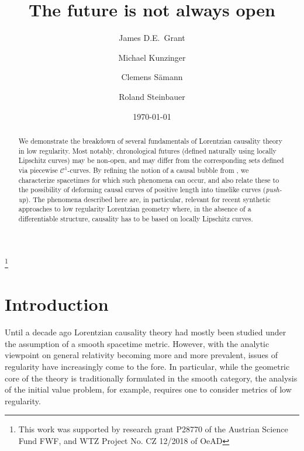 \documentclass[reqno]{amsart}
\numberwithin{equation}{section}
\theoremstyle{plain}
\theoremstyle{definition}
\theoremstyle{remark}
\begin{document}
\title{The future is not always open}
\author{James D.E.\ Grant}
\address{Department of Mathematics\\ University of Surrey\\ UK.}
\author{Michael Kunzinger}
\address{Faculty of Mathematics\\ University of Vienna\\ Austria.}
\author{Clemens S\"amann}
\address{Faculty of Mathematics\\ University of Vienna\\ Austria.}
\author{Roland Steinbauer}
\address{Faculty of Mathematics\\ University of Vienna\\ Austria.}
\date{\today}

\begin{abstract}
We demonstrate the breakdown of several fundamentals of Lorentzian causality theory in low regularity. 
Most notably, chronological futures (defined naturally using locally Lipschitz curves) may be non-open, and may differ from the corresponding
sets defined via piecewise $\mathcal{C}^1$-curves. By refining the notion of a causal bubble from \cite{CG:12},
we characterize spacetimes for which such phenomena can occur, and also relate these to
the possibility of deforming causal curves of positive length into timelike curves (\emph{push-up}).
The phenomena described here are, in particular, relevant for recent synthetic approaches to
low regularity Lorentzian geometry where, in the absence of a differentiable structure,
causality has to be based on locally Lipschitz curves.
\end{abstract}
\thanks{This work was supported by research grant P28770 of the Austrian Science Fund FWF, and WTZ Project No. CZ 12/2018 of OeAD}
\maketitle
\thispagestyle{empty}

\section{Introduction}

Until a decade ago Lorentzian causality theory had mostly been studied 
under the assumption of a smooth spacetime metric. However, with the analytic 
viewpoint on general relativity becoming more and more prevalent, issues of 
regularity have increasingly come to the fore. In particular, while the geometric 
core of the theory is traditionally formulated in the smooth category, the analysis of the 
initial value problem, for example, requires one to consider metrics of low regularity. 
\end{document}
